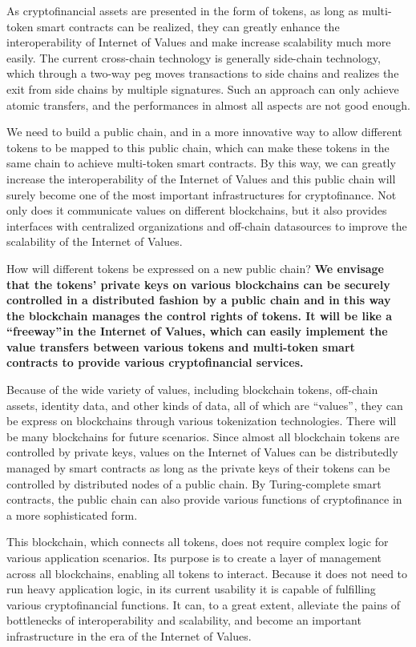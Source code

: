 \documentclass[a4paper,12pt]{article}
\begin{document}
As cryptofinancial assets are presented in the form of tokens, as long as multi-token smart contracts can be realized, they can greatly enhance the interoperability of Internet of Values and make increase scalability much more easily. The current cross-chain technology is generally side-chain technology, which through a two-way peg moves transactions to side chains and realizes the exit from side chains by multiple signatures. Such an approach can only achieve atomic transfers, and the performances in almost all aspects are not good enough.

We need to build a public chain, and in a more innovative way to allow different tokens to be mapped to this public chain, which can make these tokens in the same chain to achieve multi-token smart contracts. By this way, we can greatly increase the interoperability of the Internet of Values and this public chain will surely become one of the most important infrastructures for cryptofinance. Not only does it communicate values on different blockchains, but it also provides interfaces with centralized organizations and off-chain datasources to improve the scalability of the Internet of Values.

How will different tokens be expressed on a new public chain? \textbf{We envisage that the tokens' private keys on various blockchains can be securely controlled in a distributed fashion by a public chain and in this way the blockchain manages the control rights of tokens. It will be like a “freeway” in the Internet of Values, which can easily implement the value transfers between various tokens and multi-token smart contracts to provide various cryptofinancial services. }

Because of the wide variety of values, including blockchain tokens, off-chain assets, identity data, and other kinds of data, all of which are “values” , they can be express on blockchains through various tokenization technologies. There will be many blockchains for future scenarios. Since almost all blockchain tokens are controlled by private keys, values on the Internet of Values can be distributedly managed by smart contracts as long as the private keys of their tokens can be controlled by distributed nodes of a public chain. By Turing-complete smart contracts, the public chain can also provide various functions of cryptofinance in a more sophisticated form.

This blockchain, which connects all tokens, does not require complex logic for various application scenarios. Its purpose is to create a layer of management across all blockchains, enabling all tokens to interact. Because it does not need to run heavy application logic, in its current usability it is capable of fulfilling various cryptofinancial functions. It can, to a great extent, alleviate the pains of bottlenecks of interoperability and scalability, and become an important infrastructure in the era of the Internet of Values.
\end{document}
